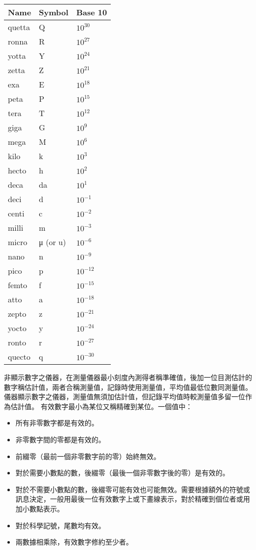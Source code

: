 \documentclass[a4paper,12pt]{article}
\begin{document}
\begin{longtable}[c]{|p{0.15\tw}|p{0.15\tw}|p{0.15\tw}|}
\hline
Name & Symbol & Base 10 \\\hline\endhead
quetta & Q & $10^{30}$ \\\hline
ronna & R & $10^{27}$ \\\hline
yotta & Y & $10^{24}$ \\\hline
zetta & Z & $10^{21}$ \\\hline
exa & E & $10^{18}$ \\\hline
peta & P & $10^{15}$ \\\hline
tera & T & $10^{12}$ \\\hline
giga & G & $10^{9}$ \\\hline
mega & M & $10^{6}$ \\\hline
kilo & k & $10^{3}$ \\\hline
hecto & h & $10^{2}$ \\\hline
deca & da & $10^{1}$ \\\hline
deci & d & $10^{-1}$ \\\hline
centi & c & $10^{-2}$ \\\hline
milli & m & $10^{-3}$ \\\hline
micro & μ (or u) & $10^{-6}$ \\\hline
nano & n & $10^{-9}$ \\\hline
pico & p & $10^{-12}$ \\\hline
femto & f & $10^{-15}$ \\\hline
atto & a & $10^{-18}$ \\\hline
zepto & z & $10^{-21}$ \\\hline
yocto & y & $10^{-24}$ \\\hline
ronto & r & $10^{-27}$ \\\hline
quecto & q & $10^{-30}$ \\\hline
\end{longtable}\FB
{}
非顯示數字之儀器，在測量儀器最小刻度內測得者稱準確值，後加一位目測估計的數字稱估計值，兩者合稱測量值，記錄時使用測量值，平均值最低位數同測量值。儀器顯示數字之儀器，測量值無須加估計值，但記錄平均值時較測量值多留一位作為估計值。
有效數字最小為某位又稱精確到某位。一個值中：
\begin{itemize}
\item 所有非零數字都是有效的。
\item 非零數字間的零都是有效的。
\item 前綴零（最前一個非零數字前的零）始終無效。
\item 對於需要小數點的數，後綴零（最後一個非零數字後的零）是有效的。
\item 對於不需要小數點的數，後綴零可能有效也可能無效。需要根據額外的符號或訊息決定，一般用最後一位有效數字上或下畫線表示，對於精確到個位者或用加小數點表示。
\item 對於科學記號，尾數均有效。
\item 兩數據相乘除，有效數字修約至少者。
\end{itemize}
\end{document}
